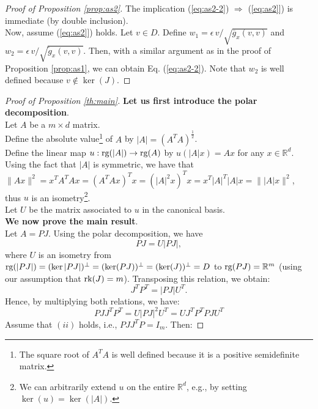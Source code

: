 \documentclass[entropy,article,submit,pdftex,moreauthors]{Definitions/mdpi}
\newcommand{\R}{\ensuremath{\mathbb{R}}}
\theoremstyle{plain}
\theoremstyle{definition}
\newcommand{\rg}{\textnormal{rg}}
\newcommand{\rk}{\textnormal{rk}}
\newcommand{\gb}{\overline{g}}
\begin{document}
\begin{proof}[Proof of Proposition \ref{prop:as2}]
The implication (\ref{eq:as2-2}) $\Rightarrow$ (\ref{eq:as2}]) is immediate (by double inclusion). \\
Now, assume (\ref{eq:as2}]) holds. Let $v \in D$. Define $w_1 = \epsilon \, v/\sqrt{\gb_x(v,v)}$ and $w_2 = \epsilon \, v  /\sqrt{\tilde{g}_x(v,v)}$. Then, with a similar argument as in the proof of Proposition \ref{prop:as1}, we can obtain Eq. (\ref{eq:as2-2}). Note that $w_2$ is well defined because $v \notin \ker(J)$.
\end{proof}

\begin{proof}[Proof of Proposition \ref{th:main}]
    \textbf{Let us first introduce the polar decomposition}. \\
    Let $A$ be a $m \times d$ matrix. \\
    Define the absolute value\footnote{The square root of $A^TA$ is well defined because it is a positive semidefinite matrix.} of $A$ by $|A| = (A^TA)^{\frac{1}{2}}$. \\
    Define the linear map $u : \rg(|A|) \rightarrow \rg(A)$ by $u(|A|x) = Ax$ for any $x \in \R^d$. \\
    Using the fact that $|A|$ is symmetric, we have that $\|Ax\|^2 = x^T A^T A x = (A^TAx)^T x = (|A|^2x)^Tx = x^T |A|^T |A| x = \||A|x\|^2$, thus $u$ is an isometry\footnote{We can arbitrarily extend $u$ on the entire $\R^d$, e.g., by setting $\ker(u) = \ker(|A|)$.}. \\
    Let $U$ be the matrix associated to $u$ in the canonical basis. \\
    \textbf{We now prove the main result}. \\
    Let $A=PJ$. Using the polar decomposition, we have
    \begin{equation*}
        PJ = U |PJ|,    
    \end{equation*}
    where $U$ is an isometry from $\rg(|PJ|) = (\ker|PJ|)^\perp = (\ker(PJ))^\perp = (\ker(J))^\perp = D$ to $\rg(PJ) = \R^m$ (using our assumption that $\rk(J) = m$). Transposing this relation, we obtain:
    \begin{equation*}
        J^TP^T=|PJ|U^T.    
    \end{equation*}
    Hence, by multiplying both relations, we have:
    \begin{equation}
        \label{eq:uniteq}
        PJJ^TP^T = U |PJ|^2 U^T = U J^TP^TPJ U^T
    \end{equation}
    Assume that $(ii)$ holds, i.e., $PJJ^TP = I_m$. Then:

\end{proof}
\end{document}
